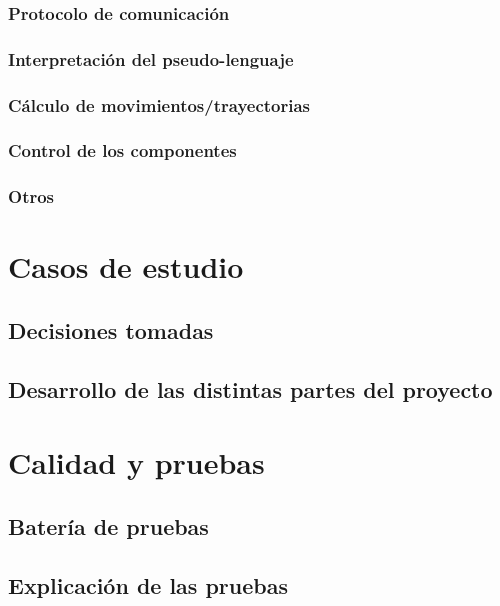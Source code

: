 \subsection{Protocolo de comunicación}

\subsection{Interpretación del pseudo-lenguaje}

\subsection{Cálculo de movimientos/trayectorias}

\subsection{Control de los componentes}

\subsection{Otros}


\chapter{Casos de estudio} %

\section{Decisiones tomadas}

\section{Desarrollo de las distintas partes del proyecto}


\chapter{Calidad y pruebas}

\section{Batería de pruebas}

\section{Explicación de las pruebas}

